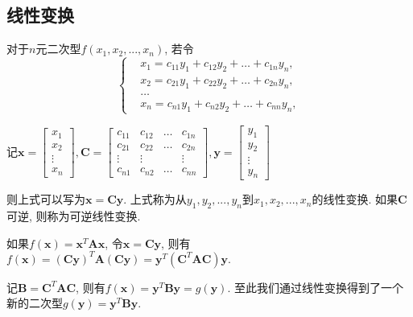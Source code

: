\subsection{线性变换}
对于$ n $元二次型$ f(x_{1}, x_{2},... ,x_{n}) $, 若令
\begin{equation*}
\left\{
\begin{aligned}
& x_{1} = c_{11}y_{1}+c_{12}y_{2}+\dots +c_{1n}y_{n}, \\
& x_{2} = c_{21}y_{1}+c_{22}y_{2}+\dots +c_{2n}y_{n}, \\
& \dots \\
& x_{n} = c_{n1}y_{1}+c_{n2}y_{2}+\dots +c_{nn}y_{n},
\end{aligned}
\right.
\end{equation*}\par
记$ \bm{x}=\begin{bmatrix}
          x_1 \\
          x_2 \\
          \vdots \\
          x_n
\end{bmatrix}, \bm{C}=\begin{bmatrix}
                      c_{11} & c_{12} & \dots & c_{1n} \\
                      c_{21} & c_{22} & \dots & c_{2n} \\
                      \vdots & \vdots &  & \vdots \\
                      c_{n1} & c_{n2} & \dots & c_{nn}
\end{bmatrix}, \bm{y}=\begin{bmatrix}
                      y_1 \\
                      y_2 \\
                      \vdots \\
                      y_n
\end{bmatrix}$\par \vspace{1em}
则上式可以写为$ \bm{x}=\bm{C}\bm{y} $. 上式称为从$ y_{1}, y_{2},... ,y_{n} $到$ x_{1}, x_{2},... ,x_{n} $的线性变换. 如果$ \bm{C} $可逆, 则称为可逆线性变换.\par
如果$ f(\bm{x})=\bm{x}^{T}\bm{A}\bm{x} $, 令$ \bm{x}=\bm{C}\bm{y} $, 则有$ f(\bm{x})=(\bm{C}\bm{y})^{T}\bm{A}(\bm{C}\bm{y})=\bm{y}^{T}(\bm{C}^{T}\bm{A}\bm{C})\bm{y}. $\par
记$ \bm{B}=\bm{C}^{T}\bm{A}\bm{C} $, 则有$ f(\bm{x})=\bm{y}^{T}\bm{B}\bm{y}=g(\bm{y}) $. 至此我们通过线性变换得到了一个新的二次型$g(\bm{y})=\bm{y}^{T}\bm{B}\bm{y}$.
